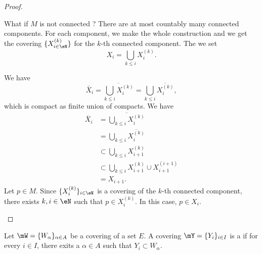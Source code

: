 \begin{proof}
\begin{subproof}
\begin{subproof}
		\end{subproof}
	\end{subproof}
	What if \( M\) is not connected ? There are at most countably many connected components. For each component, we make the whole construction and we get the covering \( \{ X^{(k)}_{i\in \eN} \}\) for the \( k\)-th connected component. The we set
	\begin{equation}
		X_i=\bigcup_{k\leq i}X_i^{(k)}.
	\end{equation}
	\begin{subproof}
		We have
		\begin{equation}
			\bar X_i=\overline{\bigcup_{k\leq i}X_i^{(k)}}=\bigcup_{k\leq i}\overline{   X_i^{(k)} },
		\end{equation}
		which is compact as finite union of compacts.
		We have
		\begin{subequations}
			\begin{align}
				\bar X_i & =\overline{    \bigcup_{k\leq i}X_i^{(k)}   }              \\
				         & =\bigcup_{k\leq i}\overline{X_i^{(k)}}                     \\
				         & \subset \bigcup_{k\leq i}X_{i+1}^{(k)}                     \\
				         & \subset \bigcup_{k\leq i}X_{i+1}^{(k)}\cup X_{i+1}^{(i+1)} \\
				         & =X_{i+1}.
			\end{align}
		\end{subequations}
		\spitem[\( M=\bigcup_{i\in \eN}X_i\)]
		Let \( p\in M\). Since \( \{ X_i^{(k)} \}_{i\in \eN}\) is a covering of the \( k\)-th connected component, there exists \( k,i\in \eN\) such that \( p\in X_i^{(k)}\). In this case, \( p\in X_i\).
	\end{subproof}
\end{proof}


\begin{definition}		\label{DEFooBDJJooAxszUA}
	Let \( \mW=\{ W_{\alpha} \}_{\alpha\in A}\) be a covering of a set \( E\). A covering \( \mY=\{ Y_i \}_{i\in I}\) is a  if for every \( i\in I\), there exits a \( \alpha\in A\) such that \( Y_i\subset W_{\alpha}\).
\end{definition}

